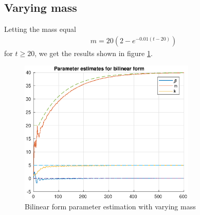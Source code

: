 \documentclass[]{article}
\begin{document}
\subsection{Varying mass}
Letting the mass equal
\begin{equation}\begin{aligned}
m = 20(2 - e^{-0.01(t-20)})
\end{aligned}\end{equation}
for $t \geq 20$, we get the results shown in figure \ref{fig:varying_mass}.
\begin{figure}[H]
\centering
\includegraphics[width=0.75\textwidth]{varying_mass.eps}
\caption{Bilinear form parameter estimation with varying mass}
\label{fig:varying_mass}
\end{figure}
\end{document}
